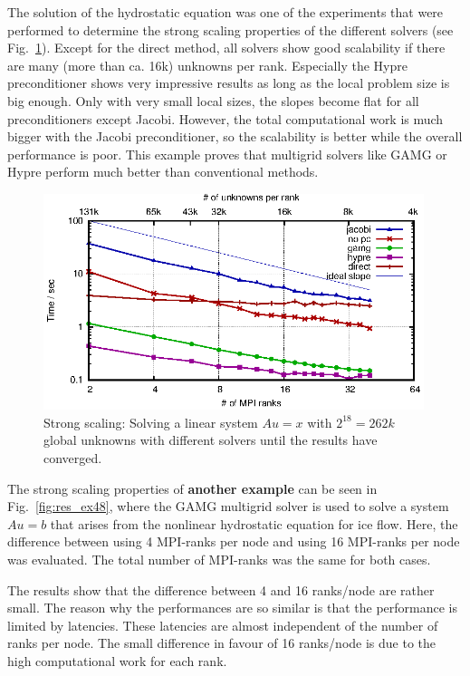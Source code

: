 The solution of the hydrostatic equation was one of the experiments that were performed to determine the strong scaling properties of the different solvers (see Fig.~\ref{fig:res_ex2_strong_time}). Except for the direct method, all solvers show good scalability if there are many (more than ca. 16k) unknowns per rank. Especially  the Hypre \cite{hypre-web-page} preconditioner shows very impressive results as long as the local problem size is big enough. Only with very small local sizes, the slopes become flat for all preconditioners except Jacobi. However, the total computational work is much bigger with the Jacobi preconditioner, so the scalability is better while the overall performance is poor. This example proves that multigrid solvers like GAMG or Hypre perform much better than conventional methods. 


\begin{figure}[tb]
	\centering
	\includegraphics[width=0.99\textwidth]{ex2_times}
	\caption{Strong scaling: Solving a linear system $Au = x$ with $2^{18} = 262k$ global unknowns with different solvers until the results have converged.} 
	\label{fig:res_ex2_strong_time}
\end{figure}

The strong scaling properties of \textbf{another example} can be seen in Fig.~\ref{fig:res_ex48}, where the GAMG multigrid solver is used to solve a system $Au = b$ that arises from the nonlinear hydrostatic equation for ice flow. Here, the difference between using 4 MPI-ranks per node and using 16 MPI-ranks per node was evaluated. The total number of MPI-ranks was the same for both cases.

The results show that the difference between 4 and 16 ranks/node are rather small. The reason why the performances are so similar is that the performance is limited by latencies. These latencies are almost independent of the number of ranks per node. The small difference in favour of 16 ranks/node is due to the high computational work for each rank.

